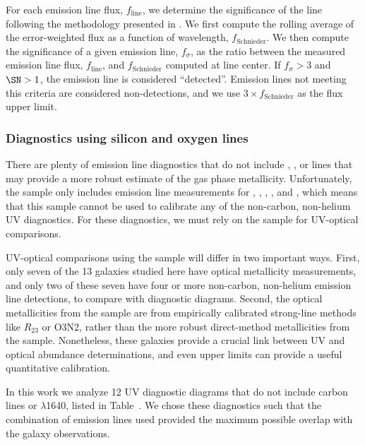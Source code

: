 For each emission line flux, $f_{\mathrm{line}}$, we determine the significance of the line following the methodology presented in \citet{Schnieider+1993}. We first compute the rolling average of the error-weighted flux as a function of wavelength, $f_{\mathrm{Schnieder}}$. We then compute the significance of a given emission line, $f_{\sigma}$, as the ratio between the measured emission line flux, $f_{\mathrm{line}}$, and $f_{\mathrm{Schnieder}}$ computed at line center. If $f_{\sigma}>3$ and $\SN > 1$, the emission line is considered ``detected''. Emission lines not meeting this criteria are considered non-detections, and we use $3\times f_{\mathrm{Schnieder}}$ as the flux upper limit.



\subsubsection{Diagnostics using silicon and oxygen lines}\label{sec:ZZ:UVOpt:Si}

There are plenty of emission line diagnostics that do not include \civ, \ciii, or \heii lines that may provide a more robust estimate of the gas phase metallicity. Unfortunately, the \citet{Berg+2016} sample only includes emission line measurements for \civ, \heii, \oiii, \SiuIII, and \ciii, which means that this sample cannot be used to calibrate any of the non-carbon, non-helium UV diagnostics. For these diagnostics, we must rely on the \mage sample for UV-optical comparisons.

UV-optical comparisons using the \mage sample will differ in two important ways. First, only seven of the 13 \mage galaxies studied here have optical metallicity measurements, and only two of these seven have four or more non-carbon, non-helium emission line detections, to compare with diagnostic diagrams. Second, the optical metallicities from the \mage sample are from empirically calibrated strong-line methods like $R_{23}$ or O3N2, rather than the more robust direct-\Te method metallicities from the \citet{Berg+2016} sample. Nonetheless, these galaxies provide a crucial link between UV and optical abundance determinations, and even upper limits can provide a useful quantitative calibration.

In this work we analyze 12 UV diagnostic diagrams that do not include carbon lines or \heii$\lambda$1640, listed in Table~\XXX. We chose these diagnostics such that the combination of emission lines used provided the maximum possible overlap with the \mage galaxy observations.

